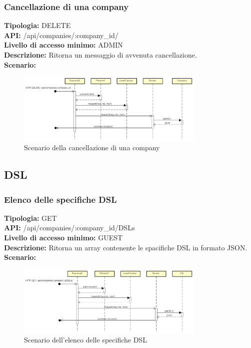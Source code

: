 \newpage
\subsubsection{Cancellazione di una company}
\textbf{Tipologia:} DELETE \\
\textbf{API:} /api/companies/:company\_id/ \\
\textbf{Livello di accesso minimo:} ADMIN \\
\textbf{Descrizione:} Ritorna un messaggio di avvenuta cancellazione. \\
\textbf{Scenario:} 
\begin{figure}[h]
\centering
\includegraphics[width=0.8\textwidth]{res/sections/backend/(DELETE)company.png}
\caption{Scenario della cancellazione di una company}
\end{figure}

\newpage
\subsection{DSL}
\subsubsection{Elenco delle specifiche DSL}
\textbf{Tipologia:} GET \\
\textbf{API:} /api/companies/:company\_id/DSLs \\
\textbf{Livello di accesso minimo:} GUEST \\
\textbf{Descrizione:} Ritorna un array contenente le spacifiche DSL in formato JSON. \\
\textbf{Scenario:} 
\begin{figure}[h]
\centering
\includegraphics[width=0.8\textwidth]{res/sections/backend/(GET)dsl.png}
\caption{Scenario dell'elenco delle specifiche DSL}
\end{figure}


